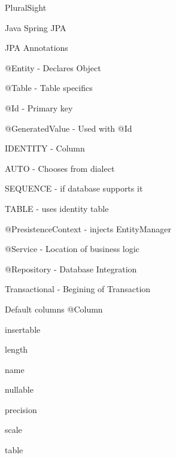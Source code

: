 \documentclass[presentation]{beamer}
\begin{document}
\begin{frame}[label={sec:org34d6546}]{PluralSight}
\begin{block}{Java Spring JPA}
\begin{block}{JPA Annotations}
\begin{block}{@Entity - Declares Object}
\end{block}
\begin{block}{@Table - Table specifics}
\end{block}
\begin{block}{@Id - Primary key}
\end{block}
\begin{block}{@GeneratedValue - Used with @Id}
\begin{block}{IDENTITY - Column}
\end{block}
\begin{block}{AUTO - Chooses from dialect}
\end{block}
\begin{block}{SEQUENCE - if database supports it}
\end{block}
\begin{block}{TABLE - uses identity table}
\end{block}
\end{block}
\begin{block}{@PresistenceContext - injects EntityManager}
\end{block}
\begin{block}{@Service - Location of business logic}
\end{block}
\begin{block}{@Repository - Database Integration}
\end{block}
\begin{block}{Transactional - Begining of Transaction}
\end{block}
\end{block}
\begin{block}{Default columns}
@Column
\begin{block}{insertable}
\end{block}
\begin{block}{length}
\end{block}
\begin{block}{name}
\end{block}
\begin{block}{nullable}
\end{block}
\begin{block}{precision}
\end{block}
\begin{block}{scale}
\end{block}
\begin{block}{table}

\end{block}
\end{block}
\end{block}
\end{frame}
\end{document}
